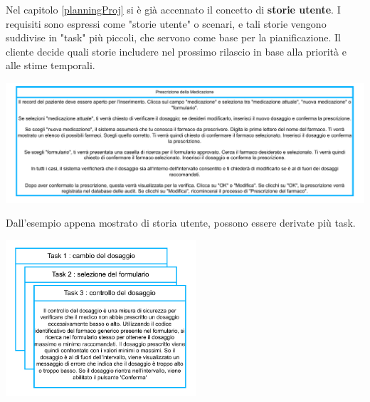 \documentclass[10pt, letterpaper]{report}
\begin{document}
Nel capitolo \ref{planningProj} si è già accennato il concetto di \textbf{storie utente}. I requisiti sono espressi come "storie utente" o scenari, e tali storie vengono suddivise in "task" più piccoli, che servono come base per la pianificazione. Il cliente decide quali storie includere nel prossimo rilascio in base alla priorità e alle stime temporali.
\begin{center}
    \includegraphics[width=1\textwidth ]{images/storiaUtente.pdf}
\end{center}
Dall'esempio appena mostrato di storia utente, possono essere derivate più task.\begin{center}
    \includegraphics[width=0.53\textwidth ]{images/task.pdf}
\end{center}
\end{document}
